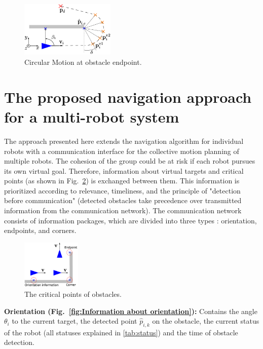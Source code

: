 \documentclass[conference]{IEEEtran}
\begin{document}
\begin{figure}[h]
    \centering
    \includegraphics[width=0.4\textwidth]{Pictures/Circular Motion at obstacle endpoint.png}
    \caption{Circular Motion at obstacle endpoint.}
    \label{fig:Circular Motion at obstacle endpoint}
\end{figure}


\section{The proposed navigation approach for a multi-robot system}
The approach presented here extends the navigation algorithm for individual robots 
with a communication interface for the collective motion planning of multiple 
robots. The cohesion of the group could be at risk if each robot 
pursues its own virtual goal. Therefore, information about virtual 
targets and critical points 
(as shown in Fig.~\ref{fig:The critical points of obstacles}) is exchanged between them. 
This information is prioritized according to relevance, timeliness, and the principle of "detection before 
communication" (detected obstacles take precedence over transmitted 
information from the communication network).
The communication network consists of information packages, which are divided into three types
: orientation, endpoints, and corners.

\begin{figure}[h]
    \centering
    \includegraphics[width=0.25\textwidth]{Pictures/The critical points of obstacles.png}
    \caption{The critical points of obstacles.}
    \label{fig:The critical points of obstacles}
\end{figure}

\textbf{Orientation (Fig.~\ref{fig:Information about orientation}):} 
Contains the angle \( \theta_i \) to the current target, the detected 
point \( \hat{p}_{i,k} \) on the obstacle, the current status of the 
robot (all statuses explained in \ref{tab:status}) and the time of obstacle detection.
\end{document}
